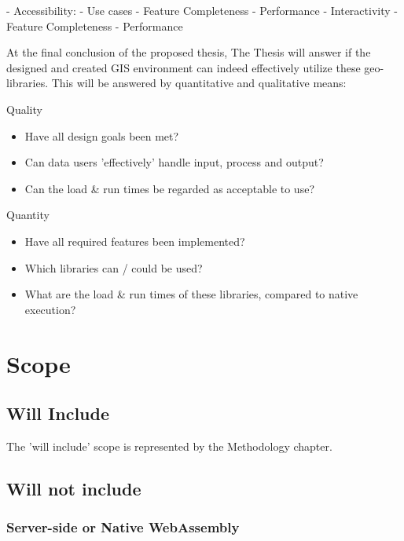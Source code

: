 - Accessibility: 
  - Use cases
    - Feature Completeness 
    - Performance
- Interactivity 
  - Feature Completeness 
  - Performance


At the final conclusion of the proposed thesis, The Thesis will answer if the designed and created GIS environment can indeed effectively utilize these geo-libraries.
This will be answered by quantitative and qualitative means:

Quality
\begin{itemize}
    \item Have all design goals been met?
    \item Can data users 'effectively' handle input, process and output?
    \item Can the load \& run times be regarded as acceptable to use? 
\end{itemize} 

Quantity
\begin{itemize}
    \item Have all required features been implemented?
    \item Which libraries can / could be used?
    \item What are the load \& run times of these libraries, compared to native execution?
\end{itemize} 

\newpage
\section{Scope}
\subsection*{Will Include}

The 'will include' scope is represented by the Methodology chapter. 


\subsection*{Will not include}

\subsubsection*{ Server-side or Native WebAssembly } %

